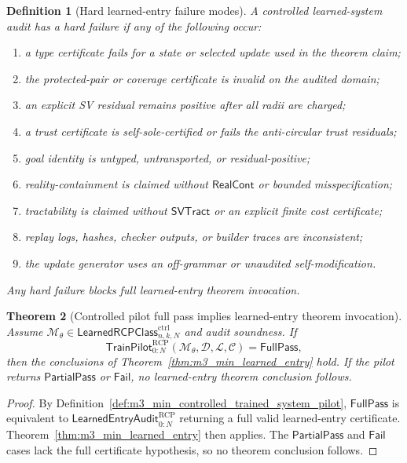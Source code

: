 \documentclass[11pt]{article}
\newtheorem{theorem}{Theorem}[section]
\newtheorem{definition}[theorem]{Definition}
\newcommand{\1}{\mathbf{1}}
\newcommand{\RCP}{\mathrm{RCP}}
\begin{document}
\begin{definition}[Hard learned-entry failure modes]
\label{def:m3_min_hard_failure_modes}
A controlled learned-system audit has a hard failure if any of the following occur:
\begin{enumerate}[label=(\roman*),leftmargin=1.5em]
    \item a type certificate fails for a state or selected update used in the theorem claim;
    \item the protected-pair or coverage certificate is invalid on the audited domain;
    \item an explicit SV residual remains positive after all radii are charged;
    \item a trust certificate is self-sole-certified or fails the anti-circular trust residuals;
    \item goal identity is untyped, untransported, or residual-positive;
    \item reality-containment is claimed without \(\mathsf{RealCont}\) or bounded misspecification;
    \item tractability is claimed without \(\mathsf{SVTract}\) or an explicit finite cost certificate;
    \item replay logs, hashes, checker outputs, or builder traces are inconsistent;
    \item the update generator uses an off-grammar or unaudited self-modification.
\end{enumerate}
Any hard failure blocks full learned-entry theorem invocation.
\end{definition}

\begin{theorem}[Controlled pilot full pass implies learned-entry theorem invocation]
\label{thm:m3_min_full_pass_invokes_theorem}
Assume \(\mathcal M_\theta\in\mathsf{LearnedRCPClass}_{n,k,N}^{\mathrm{ctrl}}\) and audit soundness.  If
\[
\mathsf{TrainPilot}_{0:N}^{\RCP}(\mathcal M_\theta,\mathcal D,\mathcal L,\mathcal C)=\mathsf{FullPass},
\]
then the conclusions of Theorem~\ref{thm:m3_min_learned_entry} hold.  If the pilot returns \(\mathsf{PartialPass}\) or \(\mathsf{Fail}\), no learned-entry theorem conclusion follows.
\end{theorem}

\begin{proof}
By Definition~\ref{def:m3_min_controlled_trained_system_pilot}, \(\mathsf{FullPass}\) is equivalent to \(\mathsf{LearnedEntryAudit}_{0:N}^{\RCP}\) returning a full valid learned-entry certificate.  Theorem~\ref{thm:m3_min_learned_entry} then applies.  The \(\mathsf{PartialPass}\) and \(\mathsf{Fail}\) cases lack the full certificate hypothesis, so no theorem conclusion follows.
\end{proof}
\end{document}
